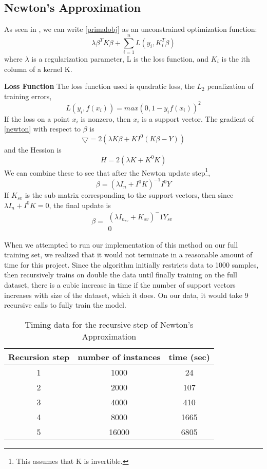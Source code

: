 \documentclass[letterpaper, 11pt]{article}
\begin{document}
\subsection{Newton's Approximation}

As seen in \citeauthor{chapelle2007training}, we can write \eqref{primalobj} as an unconstrained optimization function:
\begin{equation}
	\lambda \beta^TK\beta + \sum_{i=1}^n L(y_i, K_i^T\beta)
	\label{newton}
\end{equation}
 where $\lambda$ is a regularization parameter, L is the loss function, and $K_i$ is the ith column of a kernel K.

 \textbf{Loss Function}  The loss function used is quadratic loss, the $L_2$ penalization of training errors, $$ L(y_i, f(x_i)) = max (0, 1-y_if(x_i))^2 $$  If the loss on a point $x_i$ is nonzero, then $x_i$ is a support vector.  The gradient of \eqref{newton} with respect to $\beta$ is $$ \bigtriangledown = 2(\lambda K \beta + K I^0(K\beta -Y) ) $$ and the Hession is $$ H = 2(\lambda K + K^0 K) $$  We can combine these to see that after the Newton update step\footnote{This assumes that K is invertible.}, \begin{equation} \beta = (\lambda I_n + I^0K)^{-1}I^0Y  \end{equation}  If $K_{sv}$ is the sub matrix corresponding to the support vectors, then since $\lambda I_n + I^0 K = 0$, the final update is \begin{equation}  \beta = \begin{matrix} (\lambda I_{n_{sv}} + K_{sv})^-1 Y_{sv} \\ 0 \end{matrix}\end{equation}

When we attempted to run our implementation of this method on our full training set, we realized that it would not terminate in a reasonable amount of time for this project.  Since the algorithm initially restricts data to 1000 samples, then recursively trains on double the data until finally training on the full dataset, there is a cubic increase in time if the number of support vectors increases with size of the dataset, which it does.  On our data, it would take 9 recursive calls to fully train the model.

\begin{table}
\centering
\begin{tabular}{c|cc}
\textbf{Recursion step} & \textbf{number of instances} & \textbf{time} (sec)\\
\hline
1 & 1000 & 24\\
2 & 2000 & 107\\
3 & 4000 & 410\\
4 & 8000 & 1665\\
5 & 16000 & 6805\\
\end{tabular}
\caption{Timing data for the recursive step of Newton's Approximation}
\end{table}
\end{document}
